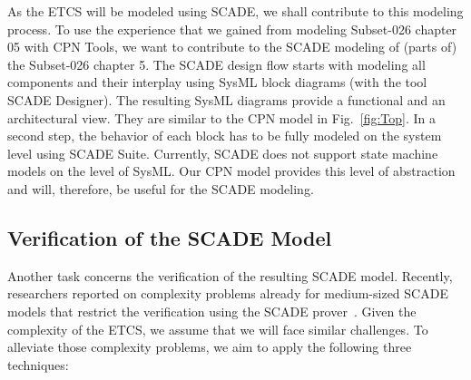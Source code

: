 As the ETCS will be modeled using SCADE, we shall contribute to this modeling process. To use the experience that we gained from modeling Subset-026 chapter 05 with CPN Tools, we want to contribute to the SCADE modeling of (parts of) the Subset-026 chapter 5. The SCADE design flow starts with modeling all components and their interplay using SysML block diagrams (with the tool SCADE Designer). The resulting SysML diagrams provide a functional and an architectural view. They are similar to the CPN model in Fig.~\ref{fig:Top}. In a second step, the behavior of each block has to be fully modeled on the system level using SCADE Suite. Currently, SCADE does not support state machine models on the level of SysML. Our CPN model provides this level of abstraction and will, therefore, be useful for the SCADE modeling.


\subsection{Verification of the SCADE Model}

Another task concerns the verification of the resulting SCADE model. Recently, researchers reported on complexity problems already for medium-sized SCADE models that restrict the verification using the SCADE prover~\cite{HuhnM2014scp,DaskayaHM2011fmics}. Given the complexity of the ETCS, we assume that we will face similar challenges. To alleviate those complexity problems, we aim to apply the following three techniques:

